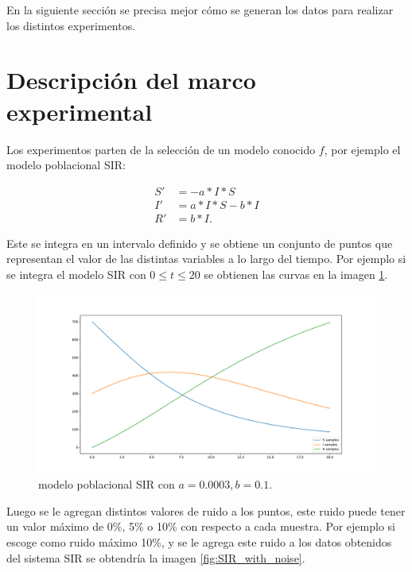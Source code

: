 En la siguiente sección se precisa mejor cómo se generan los datos para realizar los distintos experimentos.

\section{Descripción del marco experimental}

Los experimentos parten de la selección de un modelo conocido $f$, por ejemplo el modelo poblacional SIR:

\begin{align*}
    S' & = - a*I*S     \\
    I' & = a*I*S - b*I \\
    R' & = b*I.
\end{align*}

Este se integra en un intervalo definido y se obtiene un conjunto de puntos que representan el valor de las distintas variables a lo largo del tiempo. Por ejemplo si se integra el modelo SIR con $0 \leq t \leq 20$ se obtienen las curvas en la imagen \ref{fig:SIR}.

\begin{figure}[h]
    \centering
    \includegraphics[width=\textwidth]{"figures/SIR.pdf"}
    \caption{modelo poblacional SIR con $a = 0.0003, b = 0.1$.}
    \label{fig:SIR}
\end{figure}

Luego se le agregan distintos valores de ruido a los puntos, este ruido puede tener un valor máximo de 0\%, 5\% o 10\% con respecto a cada muestra. Por ejemplo si escoge como ruido máximo 10\%, y se le agrega este ruido a los datos obtenidos del sistema SIR se obtendría la imagen \ref{fig:SIR_with_noise}.

